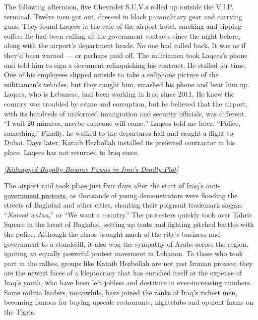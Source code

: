 The following afternoon, five Chevrolet S.U.V.s rolled up outside the
V.I.P. terminal. Twelve men got out, dressed in black paramilitary gear
and carrying guns. They found Laqees in the cafe of the airport hotel,
smoking and sipping coffee. He had been calling all his government
contacts since the night before, along with the airport's department
heads. No one had called back. It was as if they'd been warned --- or
perhaps paid off. The militiamen took Laqees's phone and told him to
sign a document relinquishing his contract. He stalled for time. One of
his employees slipped outside to take a cellphone picture of the
militiamen's vehicles, but they caught him, smashed his phone and beat
him up. Laqees, who is Lebanese, had been working in Iraq since 2011. He
knew the country was troubled by crime and corruption, but he believed
that the airport, with its hundreds of uniformed immigration and
security officials, was different. ``I wait 20 minutes, maybe someone
will come,'' Laqees told me later. ``Police, something.'' Finally, he
walked to the departures hall and caught a flight to Dubai. Days later,
Kataib Hezbollah installed its preferred contractor in his place. Laqees
has not returned to Iraq since.

\emph{\href{https://www.nytimes.com/2018/03/14/magazine/how-a-ransom-for-royal-falconers-reshaped-the-middle-east.html}{{[}Kidnapped
Royalty Become Pawns in Iran's Deadly Plot{]}}}

The airport raid took place just four days after the start of
\href{https://www.nytimes.com/2019/10/02/world/middleeast/iraq-corruption-protests.html}{Iraq's
anti-government protests}, as thousands of young demonstrators were
flooding the streets of Baghdad and other cities, chanting their
poignant trademark slogan: ``\emph{Nureed watan},'' or ``We want a
country.'' The protesters quickly took over Tahrir Square in the heart
of Baghdad, setting up tents and fighting pitched battles with the
police. Although the chaos brought much of the city's business and
government to a standstill, it also won the sympathy of Arabs across the
region, igniting an equally powerful protest movement in Lebanon. To
those who took part in the rallies, groups like Kataib Hezbollah are not
just Iranian proxies; they are the newest faces of a kleptocracy that
has enriched itself at the expense of Iraq's youth, who have been left
jobless and destitute in ever-increasing numbers. Some militia leaders,
meanwhile, have joined the ranks of Iraq's richest men, becoming famous
for buying upscale restaurants, nightclubs and opulent farms on the
Tigris.


